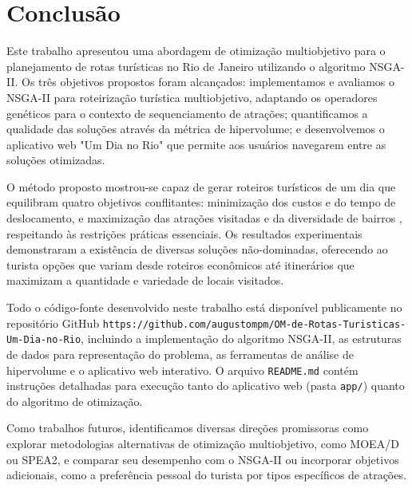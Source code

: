 \documentclass{pssbmac}
\begin{document}
\section{Conclusão}

Este trabalho apresentou uma abordagem de otimização multiobjetivo para o planejamento de rotas turísticas no Rio de Janeiro utilizando o algoritmo NSGA-II. Os três objetivos propostos foram alcançados: implementamos e avaliamos o NSGA-II para roteirização turística multiobjetivo, adaptando os operadores genéticos para o contexto de sequenciamento de atrações; quantificamos a qualidade das soluções através da métrica de hipervolume; e desenvolvemos o aplicativo web "Um Dia no Rio" que permite aos usuários navegarem entre as soluções otimizadas.

O método proposto mostrou-se capaz de gerar roteiros turísticos de um dia que equilibram quatro objetivos conflitantes: minimização dos custos e do tempo de deslocamento, e maximização das atrações visitadas e da diversidade de bairros
, respeitando às restrições práticas essenciais. Os resultados experimentais demonstraram a existência de diversas soluções não-dominadas, oferecendo ao turista opções que variam desde roteiros econômicos até itinerários que maximizam a quantidade e variedade de locais visitados.

Todo o código-fonte desenvolvido neste trabalho está disponível publicamente no repositório GitHub \texttt{https://github.com/augustompm/OM-de-Rotas-Turisticas-Um-Dia-no-Rio}, incluindo a implementação do algoritmo NSGA-II, as estruturas de dados para representação do problema, as ferramentas de análise de hipervolume e o aplicativo web interativo. O arquivo \texttt{README.md} contém instruções detalhadas para execução tanto do aplicativo web (pasta \texttt{app/}) quanto do algoritmo de otimização.

Como trabalhos futuros, identificamos diversas direções promissoras como explorar metodologias alternativas de otimização multiobjetivo, como MOEA/D ou SPEA2, e comparar seu desempenho com o NSGA-II ou incorporar objetivos adicionais, como a preferência pessoal do turista por tipos específicos de atrações.


\printbibliography
\end{document}
